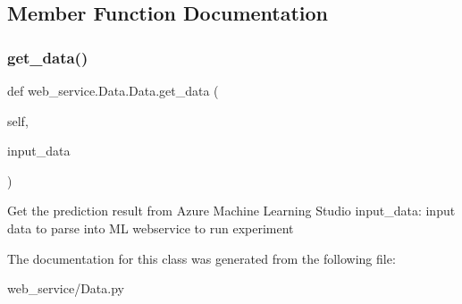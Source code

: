 \subsection{Member Function Documentation}
\mbox{\label{classweb__service_1_1_data_1_1_data_ae5f263f0a89d3a6b2bbbcac8d590f4cc}} 
\subsubsection{\texorpdfstring{get\+\_\+data()}{get\_data()}}
{\footnotesize\ttfamily def web\+\_\+service.\+Data.\+Data.\+get\+\_\+data (\begin{DoxyParamCaption}\item[{}]{self,  }\item[{}]{input\+\_\+data }\end{DoxyParamCaption})}

\begin{DoxyVerb}   Get the prediction result from Azure Machine Learning Studio
   input_data: input data to parse into ML webservice to run experiment
\end{DoxyVerb}
 

The documentation for this class was generated from the following file\+:\begin{DoxyCompactItemize}
\item 
web\+\_\+service/Data.\+py\end{DoxyCompactItemize}
